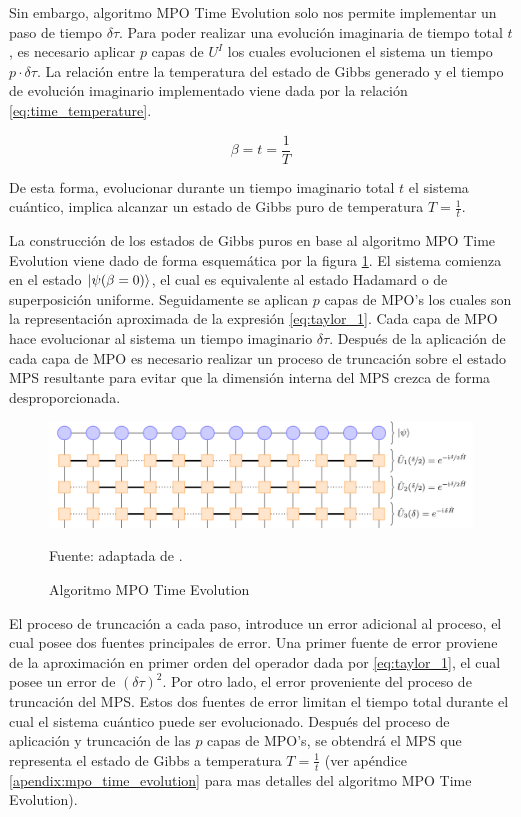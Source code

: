 Sin embargo, algoritmo MPO Time Evolution solo nos permite implementar un paso de tiempo $\delta \tau$. Para poder realizar una evolución imaginaria de tiempo total $t$, es necesario aplicar $p$ capas de $U^{I}$ los cuales evolucionen el sistema un tiempo $p \cdot \delta \tau$. La relación entre la temperatura del estado de Gibbs generado y el tiempo de evolución imaginario implementado viene dada por la relación \ref{eq:time_temperature}.

\begin{equation}
\beta = t = \frac{1}{T} 
\label{eq:time_temperature}
\end{equation}

De esta forma, evolucionar durante un tiempo imaginario total $t$ el sistema cuántico, implica alcanzar un estado de Gibbs puro de temperatura $T=\frac{1}{t}$.

\newpage

La construcción de los estados de Gibbs puros en base al algoritmo MPO Time Evolution viene dado de forma esquemática por la figura \ref{fig:mpo_time_evolution}. El sistema comienza en el estado $\ket{\psi(\beta = 0)}$, el cual es equivalente al estado Hadamard o de superposición uniforme. Seguidamente se aplican $p$ capas de MPO's los cuales son la representación aproximada de la expresión \ref{eq:taylor_1}. Cada capa de MPO hace evolucionar al sistema un tiempo imaginario $\delta \tau$. Después de la aplicación de cada capa de MPO es necesario realizar un proceso de truncación sobre el estado MPS resultante para evitar que la dimensión interna del MPS crezca de forma desproporcionada. 

\begin{figure}[!h]
    \centering
    \includegraphics[scale = 0.7]{img/05-tevo_mps_mpo.png}
    \caption{Algoritmo MPO Time Evolution}
    Fuente: adaptada de \citep{tn}.
    \label{fig:mpo_time_evolution}
\end{figure}

El proceso de truncación a cada paso, introduce un error adicional al proceso, el cual posee dos fuentes principales de error. Una primer fuente de error proviene de la aproximación en primer orden del operador dada por \ref{eq:taylor_1}, el cual posee un error de $(\delta \tau)^2$. Por otro lado, el error proveniente del proceso de truncación del MPS. Estos dos fuentes de error limitan el tiempo total durante el cual el sistema cuántico puede ser evolucionado. Después del proceso de aplicación y truncación de las $p$ capas de MPO's, se obtendrá el MPS que representa el estado de Gibbs a temperatura $T = \frac{1}{t}$ (ver apéndice \ref{apendix:mpo_time_evolution} para mas detalles del algoritmo MPO Time Evolution).